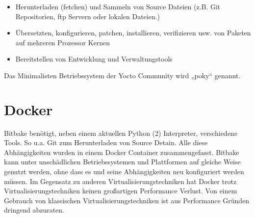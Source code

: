 \begin{itemize}
    \item Herunterladen (fetchen) und Sammeln von Source Dateien
        (z.B. Git Repositorien, ftp Servern oder lokalen Dateien.)
    \item Übersetzten, konfigurieren, patchen, installieren, verifizieren usw.
        von Paketen auf mehreren Prozessor Kernen
    \item Bereitstellen von Entwicklung und Verwaltungstools
\end{itemize}

Das Minimalisten Betriebssystem der Yocto Community wird „poky“ genannt.


\section{Docker} \label{sec:docker}
Bitbake benötigt, neben einem aktuellen Python (2) Interpreter, verschiedene
Tools. So u.a. Git zum Herunterladen von Source Detain. Alle diese
Abhängigkeiten wurden in einem \gls{Docker} Container zusammengefasst. Bitbake
kann unter unschädlichen Betriebssystemen und Plattformen auf gleiche Weise
genutzt werden, ohne dass es und seine Abhängigkeiten neu konfiguriert werden
müssen.  Im Gegensatz zu anderen Virtualisierungstechniken hat Docker trotz
Virtualisierungstechniken keinen großartigen Performance Verlust.  Von einem
Gebrauch von klassischen Virtualisierungstechniken ist aus Performance Gründen
dringend abzuraten.



